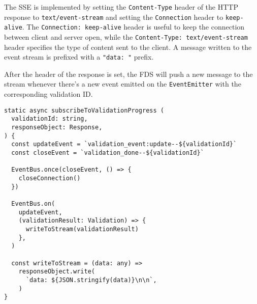     The SSE is implemented by setting the \verb;Content-Type; header of the HTTP response to \verb;text/event-stream; and setting the \verb;Connection; header to \verb;keep-alive;. The \verb;Connection: keep-alive; header is useful to keep the connection between client and server open, while the \verb;Content-Type: text/event-stream; header specifies the type of content sent to the client. A message written to the event stream is prefixed with a \verb;"data: "; prefix. 

    After the header of the response is set, the FDS will push a new message to the stream whenever there's a new event emitted on the \verb;EventEmitter; with the corresponding validation ID. 

    \begin{lstlisting}[style=es6, caption={Writing to SSE stream when certain events are published (TypeScript)}]
static async subscribeToValidationProgress (
  validationId: string,
  responseObject: Response,
) {
  const updateEvent = `validation_event:update--${validationId}`
  const closeEvent = `validation_done--${validationId}`

  EventBus.once(closeEvent, () => {
    closeConnection()
  })

  EventBus.on(
    updateEvent,
    (validationResult: Validation) => {
      writeToStream(validationResult)
    },
  )

  const writeToStream = (data: any) =>
    responseObject.write(
      `data: ${JSON.stringify(data)}\n\n`,
    )
}
    \end{lstlisting}

